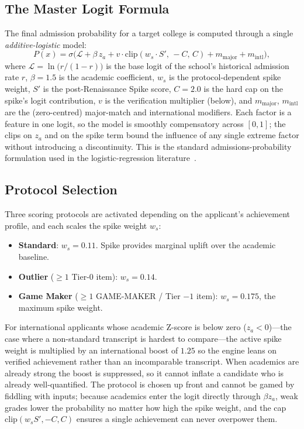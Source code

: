 \documentclass[conference]{IEEEtran}
\begin{document}
\subsection{The Master Logit Formula}
The final admission probability for a target college is computed through a single \textit{additive-logistic} model:
\begin{equation}
P(x) = \sigma\!\bigl(\mathcal{L} + \beta \, z_a + v \cdot \mathrm{clip}(w_s \cdot S',\, -C,\, C) + m_{\text{major}} + m_{\text{intl}}\bigr),
\end{equation}
where $\mathcal{L} = \ln\!\bigl(r/(1-r)\bigr)$ is the base logit of the school's historical admission rate $r$, $\beta = 1.5$ is the academic coefficient, $w_s$ is the protocol-dependent spike weight, $S'$ is the post-Renaissance Spike score, $C = 2.0$ is the hard cap on the spike's logit contribution, $v$ is the verification multiplier (below), and $m_{\text{major}}$, $m_{\text{intl}}$ are the (zero-centred) major-match and international modifiers. Each factor is a feature in one logit, so the model is smoothly compensatory across $[0,1]$; the clips on $z_a$ and on the spike term bound the influence of any single extreme factor without introducing a discontinuity. This is the standard admissions-probability formulation used in the logistic-regression literature~\cite{giani,lee}.

\subsection{Protocol Selection}
Three scoring protocols are activated depending on the applicant's achievement profile, and each scales the spike weight $w_s$:
\begin{itemize}
    \item \textbf{Standard}: $w_s = 0.11$. Spike provides marginal uplift over the academic baseline.
    \item \textbf{Outlier} ($\geq 1$ Tier-0 item): $w_s = 0.14$.
    \item \textbf{Game Maker} ($\geq 1$ GAME-MAKER / Tier $-1$ item): $w_s = 0.175$, the maximum spike weight.
\end{itemize}
For international applicants whose academic Z-score is below zero ($z_a < 0$)---the case where a non-standard transcript is hardest to compare---the active spike weight is multiplied by an international boost of $1.25$ so the engine leans on verified achievement rather than an incomparable transcript. When academics are already strong the boost is suppressed, so it cannot inflate a candidate who is already well-quantified. The protocol is chosen up front and cannot be gamed by fiddling with inputs; because academics enter the logit directly through $\beta z_a$, weak grades lower the probability no matter how high the spike weight, and the cap $\mathrm{clip}(w_s S', -C, C)$ ensures a single achievement can never overpower them.
\end{document}
